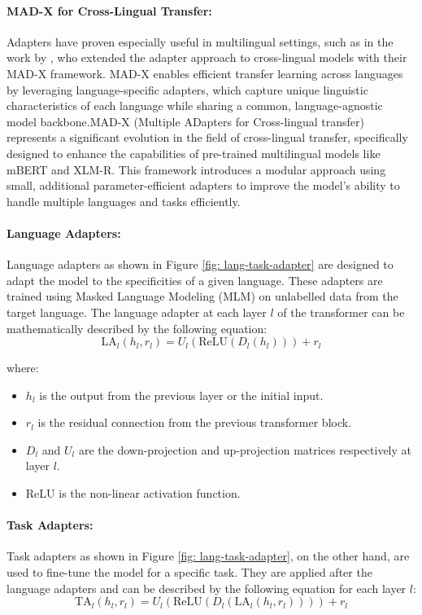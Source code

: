 \paragraph{MAD-X for Cross-Lingual Transfer:} Adapters have proven especially useful in multilingual settings, such as in the work by \citet{pfeiffer2020mad}, who extended the adapter approach to cross-lingual models with their MAD-X framework. MAD-X enables efficient transfer learning across languages by leveraging language-specific adapters, which capture unique linguistic characteristics of each language while sharing a common, language-agnostic model backbone.MAD-X (Multiple ADapters for Cross-lingual transfer) represents a significant evolution in the field of cross-lingual transfer, specifically designed to enhance the capabilities of pre-trained multilingual models like mBERT and XLM-R. This framework introduces a modular approach using small, additional parameter-efficient adapters to improve the model's ability to handle multiple languages and tasks efficiently.

\paragraph{Language Adapters:} Language adapters as shown in Figure \ref{fig: lang-task-adapter} are designed to adapt the model to the specificities of a given language. These adapters are trained using Masked Language Modeling (MLM) on unlabelled data from the target language. The language adapter at each layer $l$ of the transformer can be mathematically described by the following equation:
\begin{equation}
	\text{LA}_l(h_l, r_l) = U_l(\text{ReLU}(D_l(h_l))) + r_l
\end{equation}

where:
\begin{itemize}
	\item $h_l$ is the output from the previous layer or the initial input.
	\item $r_l$ is the residual connection from the previous transformer block.
	\item $D_l$ and $U_l$ are the down-projection and up-projection matrices respectively at layer $l$.
	\item $\text{ReLU}$ is the non-linear activation function.
\end{itemize}

\paragraph{Task Adapters:} Task adapters as shown in Figure \ref{fig: lang-task-adapter}, on the other hand, are used to fine-tune the model for a specific task. They are applied after the language adapters and can be described by the following equation for each layer $l$:
\begin{equation}
\text{TA}_l(h_l, r_l) = U_l(\text{ReLU}(D_l(\text{LA}_l(h_l, r_l)))) + r_l
\end{equation}

